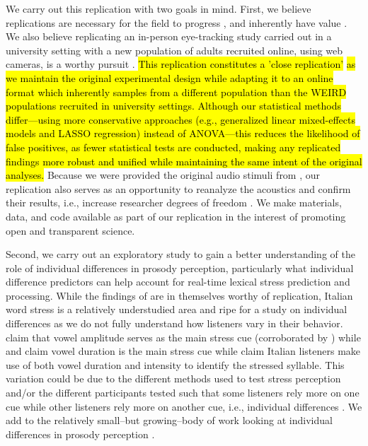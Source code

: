 We carry out this replication with two goals in mind. First, we believe replications are necessary for the field to progress \citep{Rakosi2017}, and inherently have value \citep{Kobrock2023}. We also believe replicating an in-person eye-tracking study carried out in a university setting with a new population of adults recruited online, using web cameras, is a worthy pursuit \citep{Prystauka_Altmann_Rothman_2023}. \hl{This replication constitutes a 'close replication' }\citep{mcmanus2022replication} \hl{as we maintain the original experimental design while adapting it to an online format which inherently samples from a different population than the WEIRD populations recruited in university settings. Although our statistical methods differ—using more conservative approaches (e.g., generalized linear mixed-effects models and LASSO regression) instead of ANOVA—this reduces the likelihood of false positives, as fewer statistical tests are conducted, making any replicated findings more robust and unified while maintaining the same intent of the original analyses.} Because we were provided the original audio stimuli from \cite{Sulpizio_McQueen_2012}, our replication also serves as an opportunity to reanalyze the acoustics and confirm their results, i.e., increase researcher degrees of freedom \citep{Corretta2023}. We make materials, data, and code available as part of our replication in the interest of promoting open and transparent science.

Second, we carry out an exploratory study to gain a better understanding of the role of individual differences in prosody perception, particularly what individual difference predictors can help account for real-time lexical stress prediction and processing. While the findings of \cite{Sulpizio_McQueen_2012} are in themselves worthy of replication, Italian word stress is a relatively understudied area and ripe for a study on individual differences as we do not fully understand how listeners vary in their behavior. \cite{Maturi1998} claim that vowel amplitude serves as the main stress cue (corroborated by \cite{Sulpizio_McQueen_2012}) while \cite{Alfano2006} and \cite{Alfano2009} claim vowel duration is the main stress cue while \cite{Tagliapietra2005} claim Italian listeners make use of both vowel duration and intensity to identify the stressed syllable. This variation could be due to the different methods used to test stress perception and/or the different participants tested such that some listeners rely more on one cue while other listeners rely more on another cue, i.e., individual differences  \citep{Yu2019, Kidd2018}. We add to the relatively small--but growing--body of work looking at individual differences in prosody perception \citep[e.g.,][]{Roy2017, Bishop2017, Lameris2023, Sinagra2022}.


